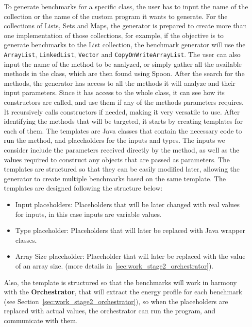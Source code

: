To generate benchmarks for a specific class, the user has to input the name of the collection or the name of the custom program it wants to generate. For the collections of Lists, Sets and Maps, the generator is prepared to create more than one implementation of those collections, for example, if the objective is to generate benchmarks to the List collection, the benchmark generator will use the \texttt{ArrayList}, \texttt{LinkedList}, \texttt{Vector} and \texttt{CopyOnWriteArrayList}. The user can also input the name of the method to be analyzed, or simply gather all the available methods in the class, which are then found using Spoon.
After the search for the methods, the generator has access to all the methods it will analyze and their input parameters. 
Since it has access to the whole class, it can see how its constructors are called, and use them if any of the methods parameters requires. 
It recursively calls constructors if needed, making it very versatile to use. After identifying the methods that will be targeted, it starts by creating templates for each of them. The templates are Java classes that contain the necessary code to run the method, and placeholders for the inputs and types. The inputs we consider include the parameters received directly by the method, as well as the values required to construct any objects that are passed as parameters. The templates are structured so that they can be easily modified later, allowing the generator to create multiple benchmarks based on the same template. The templates are designed following the structure below:

\begin{itemize}

\item Input placeholders: Placeholders that will be later changed with real values for inputs, in this case inputs are variable values. 

\item Type placeholder: Placeholders that will later be replaced with Java wrapper classes.
  
\item Array Size placeholder: Placeholder that will later be replaced with the value of an array size. (more details in~\ref{sec:work_stage2_orchestrator}). 

\end{itemize}

Also, the template is structured so that the benchmarks will work in harmony with the \textbf{Orchestrator}, that will extract the energy profile for each benchmark (see Section~\ref{sec:work_stage2_orchestrator}), so when the placeholders are replaced with actual values, the orchestrator can run the program, and communicate with them.


